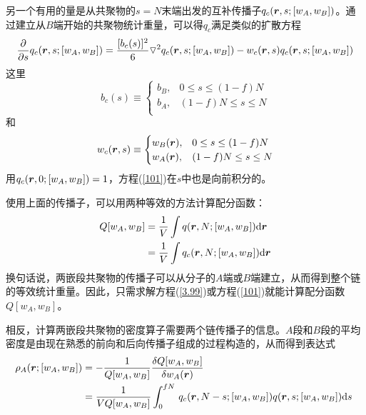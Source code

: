 另一个有用的量是从共聚物的$s=N$末端出发的互补传播子$q_c(\bm{r},s;[w_A,w_B])$。通过建立从$B$端开始的共聚物统计重量，可以得$q_c$满足类似的扩散方程
\begin{equation}
\frac{\partial}{\partial s}q_c(\bm{r},s;[w_A,w_B])=\frac{[b_c(s)]^2}{6}\triangledown ^2q_c(\bm{r},s;[w_A,w_B])-w_c(\bm{r},s)q_c(\bm{r},s;[w_A,w_B]) \label{101}
\end{equation}
这里
\begin{equation}
b_c (s)\equiv
\begin{cases}
b_B, & 0\leq s \leq (1-f)N \\
b_A, & (1-f)N \leq s \leq N\\
\end{cases}
\end{equation}
和
\begin{equation}
w_c (\bm{r},s)\equiv
\begin{cases}
w_B(\bm{r}), & 0\leq s \leq (1-f)N \\
w_A(\bm{r}), & (1-f)N \leq s \leq N\\
\end{cases}
\end{equation}
用$q_c(\bm{r},0;[w_A,w_B])=1$，方程(\ref{101})在$s$中也是向前积分的。		

使用上面的传播子，可以用两种等效的方法计算配分函数：
\begin{equation}
\begin{aligned}
Q[w_A,w_B] & = \frac{1}{V}\int q(\bm{r},N;[w_A,w_B]) \mathrm{d}\bm{r} \\
&=\frac{1}{V}\int q_c(\bm{r},N;[w_A,w_B]) \mathrm{d}\bm{r} \\
\end{aligned}	
\end{equation}
换句话说，两嵌段共聚物的传播子可以从分子的$A$端或$B$端建立，从而得到整个链的等效统计重量。因此，只需求解方程(\ref{3.99})或方程(\ref{101})就能计算配分函数$Q[w_A,w_B]$。

相反，计算两嵌段共聚物的密度算子需要两个链传播子的信息。$A$段和$B$段的平均密度是由现在熟悉的前向和后向传播子组成的过程构造的，从而得到表达式
\begin{equation}
\begin{aligned}
\rho _A(\bm{r};[w_A,w_B]) & =-\frac{1}{Q[w_A,w_B]}	\frac{\delta Q[w_A,w_B]}{\delta w_A(\bm{r})} \\
& =\frac{1}{VQ[w_A,w_B]} \int _{0}^{fN}\,q_c(\bm{r},N-s;[w_A,w_B])q(\bm{r},s;[w_A,w_B]) \mathrm{d}s~ \\
\end{aligned}	
\end{equation}

